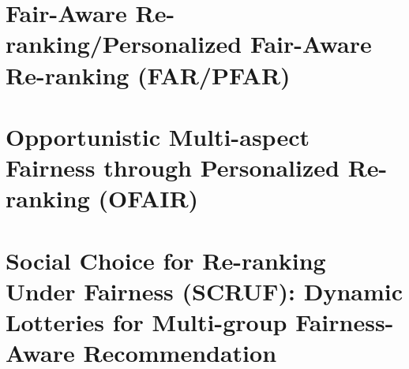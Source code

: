 \section{Fair-Aware Re-ranking/Personalized Fair-Aware Re-ranking (FAR/PFAR)}
    
    

\section{Opportunistic Multi-aspect Fairness through Personalized Re-ranking (OFAIR)}
    
    
\section{Social Choice for Re-ranking Under Fairness (SCRUF): Dynamic Lotteries for Multi-group Fairness-Aware Recommendation}

